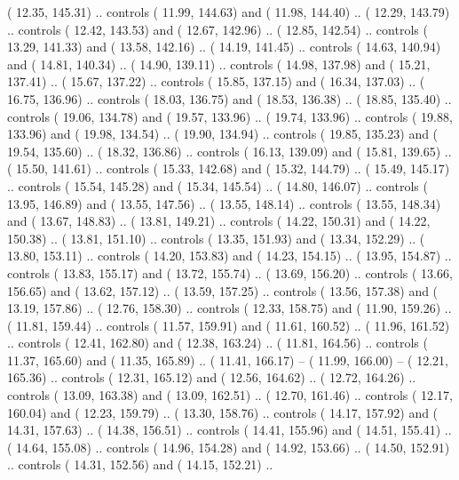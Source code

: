 {        (  12.35, 145.31) .. controls (  11.99, 144.63) and (  11.98, 144.40) ..
        (  12.29, 143.79) .. controls (  12.42, 143.53) and (  12.67, 142.96) ..
        (  12.85, 142.54) .. controls (  13.29, 141.33) and (  13.58, 142.16) ..
        (  14.19, 141.45) .. controls (  14.63, 140.94) and (  14.81, 140.34) ..
        (  14.90, 139.11) .. controls (  14.98, 137.98) and (  15.21, 137.41) ..
        (  15.67, 137.22) .. controls (  15.85, 137.15) and (  16.34, 137.03) ..
        (  16.75, 136.96) .. controls (  18.03, 136.75) and (  18.53, 136.38) ..
        (  18.85, 135.40) .. controls (  19.06, 134.78) and (  19.57, 133.96) ..
        (  19.74, 133.96) .. controls (  19.88, 133.96) and (  19.98, 134.54) ..
        (  19.90, 134.94) .. controls (  19.85, 135.23) and (  19.54, 135.60) ..
        (  18.32, 136.86) .. controls (  16.13, 139.09) and (  15.81, 139.65) ..
        (  15.50, 141.61) .. controls (  15.33, 142.68) and (  15.32, 144.79) ..
        (  15.49, 145.17) .. controls (  15.54, 145.28) and (  15.34, 145.54) ..
        (  14.80, 146.07) .. controls (  13.95, 146.89) and (  13.55, 147.56) ..
        (  13.55, 148.14) .. controls (  13.55, 148.34) and (  13.67, 148.83) ..
        (  13.81, 149.21) .. controls (  14.22, 150.31) and (  14.22, 150.38) ..
        (  13.81, 151.10) .. controls (  13.35, 151.93) and (  13.34, 152.29) ..
        (  13.80, 153.11) .. controls (  14.20, 153.83) and (  14.23, 154.15) ..
        (  13.95, 154.87) .. controls (  13.83, 155.17) and (  13.72, 155.74) ..
        (  13.69, 156.20) .. controls (  13.66, 156.65) and (  13.62, 157.12) ..
        (  13.59, 157.25) .. controls (  13.56, 157.38) and (  13.19, 157.86) ..
        (  12.76, 158.30) .. controls (  12.33, 158.75) and (  11.90, 159.26) ..
        (  11.81, 159.44) .. controls (  11.57, 159.91) and (  11.61, 160.52) ..
        (  11.96, 161.52) .. controls (  12.41, 162.80) and (  12.38, 163.24) ..
        (  11.81, 164.56) .. controls (  11.37, 165.60) and (  11.35, 165.89) ..
        (  11.41, 166.17) -- 
        (  11.99, 166.00) -- 
        (  12.21, 165.36) .. controls (  12.31, 165.12) and (  12.56, 164.62) ..
        (  12.72, 164.26) .. controls (  13.09, 163.38) and (  13.09, 162.51) ..
        (  12.70, 161.46) .. controls (  12.17, 160.04) and (  12.23, 159.79) ..
        (  13.30, 158.76) .. controls (  14.17, 157.92) and (  14.31, 157.63) ..
        (  14.38, 156.51) .. controls (  14.41, 155.96) and (  14.51, 155.41) ..
        (  14.64, 155.08) .. controls (  14.96, 154.28) and (  14.92, 153.66) ..
        (  14.50, 152.91) .. controls (  14.31, 152.56) and (  14.15, 152.21) ..
}
